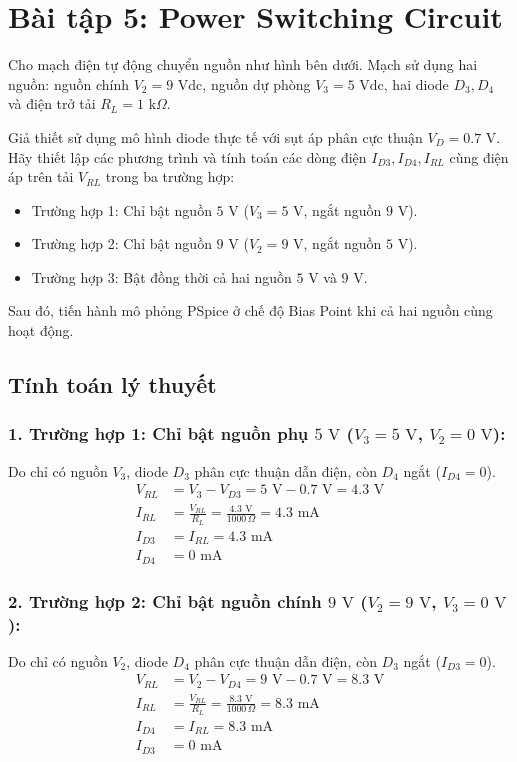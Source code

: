 \section{Bài tập 5: Power Switching Circuit}
Cho mạch điện tự động chuyển nguồn như hình bên dưới. Mạch sử dụng hai nguồn: nguồn chính $V_2 = 9\text{ Vdc}$, nguồn dự phòng $V_3 = 5\text{ Vdc}$, hai diode $D_3, D_4$ và điện trở tải $R_L = 1\text{ k}\Omega$.

Giả thiết sử dụng mô hình diode thực tế với sụt áp phân cực thuận $V_D = 0.7\text{ V}$. Hãy thiết lập các phương trình và tính toán các dòng điện $I_{D3}, I_{D4}, I_{RL}$ cùng điện áp trên tải $V_{RL}$ trong ba trường hợp:
\begin{itemize}[leftmargin=1.5em]
  \item Trường hợp 1: Chỉ bật nguồn $5\text{ V}$ ($V_3 = 5\text{ V}$, ngắt nguồn $9\text{ V}$).
  \item Trường hợp 2: Chỉ bật nguồn $9\text{ V}$ ($V_2 = 9\text{ V}$, ngắt nguồn $5\text{ V}$).
  \item Trường hợp 3: Bật đồng thời cả hai nguồn $5\text{ V}$ và $9\text{ V}$.
\end{itemize}
Sau đó, tiến hành mô phỏng PSpice ở chế độ Bias Point khi cả hai nguồn cùng hoạt động.


\subsection{Tính toán lý thuyết}
\subsubsection*{1. Trường hợp 1: Chỉ bật nguồn phụ $5\text{ V}$ ($V_3 = 5\text{ V}$, $V_2 = 0\text{ V}$):}
Do chỉ có nguồn $V_3$, diode $D_3$ phân cực thuận dẫn điện, còn $D_4$ ngắt ($I_{D4} = 0$).
\begin{align*}
  V_{RL} &= V_3 - V_{D3} = 5\text{ V} - 0.7\text{ V} = 4.3\text{ V} \\
  I_{RL} &= \frac{V_{RL}}{R_L} = \frac{4.3\text{ V}}{1000\,\Omega} = 4.3\text{ mA} \\
  I_{D3} &= I_{RL} = 4.3\text{ mA} \\
  I_{D4} &= 0\text{ mA}
\end{align*}

\subsubsection*{2. Trường hợp 2: Chỉ bật nguồn chính $9\text{ V}$ ($V_2 = 9\text{ V}$, $V_3 = 0\text{ V}$):}
Do chỉ có nguồn $V_2$, diode $D_4$ phân cực thuận dẫn điện, còn $D_3$ ngắt ($I_{D3} = 0$).
\begin{align*}
  V_{RL} &= V_2 - V_{D4} = 9\text{ V} - 0.7\text{ V} = 8.3\text{ V} \\
  I_{RL} &= \frac{V_{RL}}{R_L} = \frac{8.3\text{ V}}{1000\,\Omega} = 8.3\text{ mA} \\
  I_{D4} &= I_{RL} = 8.3\text{ mA} \\
  I_{D3} &= 0\text{ mA}
\end{align*}

